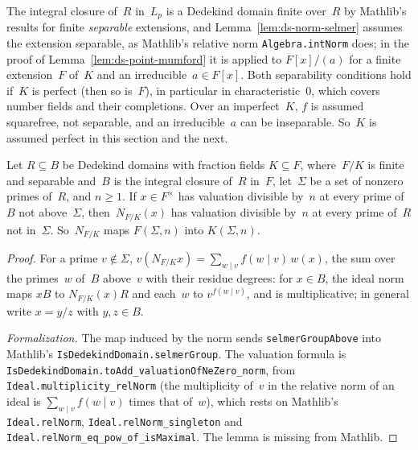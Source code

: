 \begin{remark}[Separability]
\label{rem:ds-perfect}
The integral closure of~$R$ in~$L_p$ is a Dedekind domain finite over~$R$ by Mathlib's results for
finite \emph{separable} extensions, and Lemma~\ref{lem:ds-norm-selmer} assumes the extension
separable, as Mathlib's relative norm \texttt{Algebra.intNorm} does; in the proof of
Lemma~\ref{lem:ds-point-mumford} it is applied to $F[x]/(a)$ for a finite extension~$F$ of~$K$ and
an irreducible~$a \in F[x]$. Both separability conditions hold if~$K$ is perfect (then so is~$F$),
in particular in characteristic~$0$, which covers number fields and their completions. Over an
imperfect~$K$, $f$ is assumed squarefree, not separable, and an irreducible~$a$ can be
inseparable. So~$K$ is assumed perfect in this section and the next.
\end{remark}

\begin{lemma}
\label{lem:ds-norm-selmer}
\leanok
Let $R \subseteq B$ be Dedekind domains with fraction fields $K \subseteq F$, where~$F/K$ is finite
and separable and~$B$ is the integral closure of~$R$ in~$F$, let~$\Sigma$ be a set of nonzero
primes of~$R$, and $n \ge 1$. If $x \in F^\times$ has valuation divisible by~$n$ at every prime
of~$B$ not above~$\Sigma$, then~$N_{F/K}(x)$ has valuation divisible by~$n$ at every prime of~$R$
not in~$\Sigma$. So~$N_{F/K}$ maps $F(\Sigma, n)$ into $K(\Sigma, n)$.
\end{lemma}

\begin{proof}
\leanok
For a prime $v \notin \Sigma$, $v(N_{F/K}x) = \sum_{w \mid v} f(w \mid v)\,w(x)$, the sum over the
primes~$w$ of~$B$ above~$v$ with their residue degrees: for $x \in B$, the ideal norm maps $xB$ to
$N_{F/K}(x)R$ and each~$w$ to $v^{f(w \mid v)}$, and is multiplicative; in general write
$x = y/z$ with $y, z \in B$.

\emph{Formalization.} The map induced by the norm sends \texttt{selmerGroupAbove} into Mathlib's
\texttt{IsDedekindDomain.selmerGroup}. The valuation formula is
\texttt{IsDedekindDomain.toAdd\_valuationOfNeZero\_norm}, from \texttt{Ideal.multiplicity\_relNorm}
(the multiplicity of~$v$ in the relative norm of an ideal is $\sum_{w \mid v} f(w \mid v)$ times
that of~$w$), which rests on Mathlib's \texttt{Ideal.relNorm}, \texttt{Ideal.relNorm\_singleton}
and \texttt{Ideal.relNorm\_eq\_pow\_of\_isMaximal}. The lemma is missing from Mathlib.
\end{proof}

